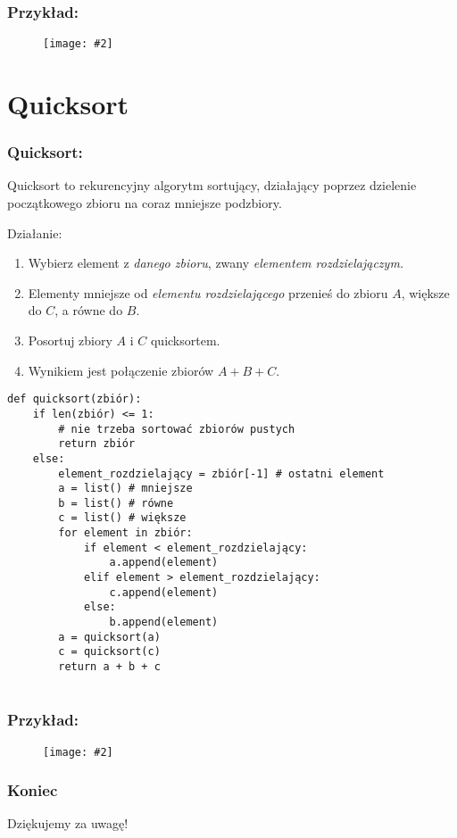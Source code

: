 \documentclass{beamer}
\newcommand{\obrazek}[2]{
        \begin{figure}[h]
            \centering
            \texttt{[image: \#2]}
        \end{figure}
    }
\begin{document}
    \begin{frame}
        \frametitle{Przykład:}
        \obrazek{.5}{binarySearchExample.png}
    \end{frame}

    \section{Quicksort}
    \begin{frame}
        \frametitle{Quicksort:}
            Quicksort to rekurencyjny algorytm sortujący, działający poprzez dzielenie początkowego zbioru na coraz mniejsze podzbiory. 
            \vspace{5mm}

            Działanie:
            \begin{enumerate}
                \item Wybierz element z \emph{danego zbioru}, zwany \emph{elementem rozdzielajączym.}
                \item Elementy mniejsze od \emph{elementu rozdzielającego} przenieś do zbioru $A$, większe do $C$, a równe do $B$.
                \item Posortuj zbiory $A$ i $C$ quicksortem.
                \item Wynikiem jest połączenie zbiorów $A + B + C$.
            \end{enumerate}
    \end{frame}
    \begin{verbatim}
def quicksort(zbiór):
    if len(zbiór) <= 1:
        # nie trzeba sortować zbiorów pustych 
        return zbiór
    else:
        element_rozdzielający = zbiór[-1] # ostatni element
        a = list() # mniejsze
        b = list() # równe
        c = list() # większe
        for element in zbiór:
            if element < element_rozdzielający:
                a.append(element)
            elif element > element_rozdzielający:
                c.append(element)
            else:
                b.append(element)
        a = quicksort(a)
        c = quicksort(c)
        return a + b + c
        
    \end{verbatim}

    \begin{frame}
        \frametitle{Przykład:}
        \obrazek{.5}{quicksortExample.png}
    \end{frame}

    \begin{frame}
        \frametitle{Koniec}
        \begin{center}
            Dziękujemy za uwagę!
        \end{center}
    \end{frame}
\end{document}
